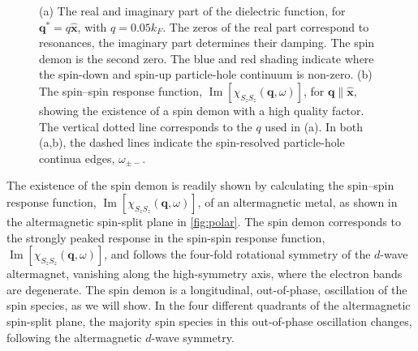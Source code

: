 \documentclass[aps,prl,reprint,twocolumns,superscriptaddress]{revtex4-2}
\DeclareMathOperator{\Imm}{Im}
\newcommand{\xx}{\hat{\bm{x}}}
\newcommand{\kF}{k_{F}}
\begin{document}
	
	\begin{figure}
		\caption{(a) The real and imaginary part of the dielectric function, for $\bm q^* = q \hat{\bm x}$, with $q=0.05\kF$. The zeros of the real part correspond to resonances, the imaginary part determines their damping. The spin demon is the second zero. The blue and red shading indicate where the spin-down and spin-up particle-hole continuum is non-zero. (b)  The spin–spin response function, $\Imm[\chi_{S_zS_z}(\bm q,\omega)]$, for $\bm q\parallel\xx$, showing the existence of a spin demon with a high quality factor. The vertical dotted line corresponds to the $q$ used in (a). In both (a,b), the dashed lines indicate the spin-resolved particle-hole continua edges, $\omega_{\pm-}$.\label{fig:alongx} }
	\end{figure}
	The existence of the spin demon is readily shown by calculating the spin–spin response function, $\Imm[\chi_{S_zS_z}(\bm q,\omega)]$, of an altermagnetic metal, as shown in the altermagnetic spin-split plane in \cref{fig:polar}. The spin demon corresponds to the strongly peaked response in the spin-spin response function, $\Imm[\chi_{S_zS_z}(\bm q,\omega)]$, and follows the four-fold rotational symmetry of the $d$-wave altermagnet, vanishing along the high-symmetry axis, where the electron bands are degenerate. The spin demon is a longitudinal, out-of-phase, oscillation of the spin species, as we will show. In the four different quadrants of the altermagnetic spin-split plane, the majority spin species in this out-of-phase oscillation changes, following the altermagnetic $d$-wave symmetry. 
	
\end{document}
